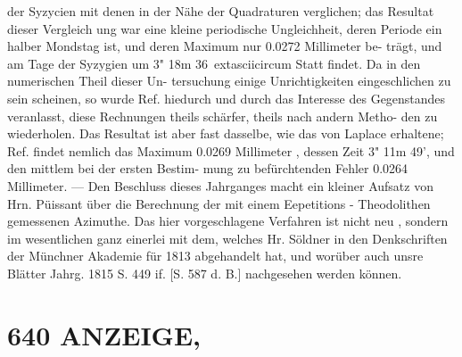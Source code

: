 \documentclass[12pt,a4paper]{article}
\begin{document}
{{{{{{{{der  Syzycien  mit  denen in  der  Nähe  der  Quadraturen  verglichen;  das  Resultat  dieser  Vergleich ung  war  eine  kleine  periodische Ungleichheit,  deren  Periode  ein  halber  Mondstag  ist,  und  deren  Maximum  nur  0.0272  Millimeter  be- trägt, und  am  Tage  der  Syzygien  um  3"  18m  36\	extasciicircum{}{ }  Statt  findet.  Da  in  den  numerischen  Theil  dieser  Un- tersuchung einige  Unrichtigkeiten  eingeschlichen  zu  sein  scheinen,  so  wurde  Ref.  hiedurch  und  durch das  Interesse  des  Gegenstandes  veranlasst,  diese  Rechnungen  theils  schärfer,  theils  nach  andern  Metho- den zu  wiederholen.  Das  Resultat  ist  aber  fast  dasselbe,  wie  das  von  Laplace  erhaltene;  Ref.  findet nemlich  das  Maximum  0.0269  Millimeter ,  dessen  Zeit  3"  11m  49',  und  den  mittlem  bei  der  ersten  Bestim- mung zu  befürchtenden  Fehler  0.0264  Millimeter.  ---  Den  Beschluss  dieses  Jahrganges  macht  ein  kleiner Aufsatz  von  Hrn.  Püissant  über  die  Berechnung  der  mit  einem  Eepetitions  -  Theodolithen  gemessenen Azimuthe.  Das  hier  vorgeschlagene  Verfahren  ist  nicht  neu ,  sondern  im  wesentlichen  ganz  einerlei  mit dem,  welches  Hr.  Söldner  in  den  Denkschriften  der  Münchner  Akademie  für  1813  abgehandelt  hat,  und worüber  auch  unsre  Blätter  Jahrg.  1815  S.  449  if.  [S.  587  d.  B.]  nachgesehen  werden  können.


\section*{640  ANZEIGE,}

}}}}}}}}
\end{document}
